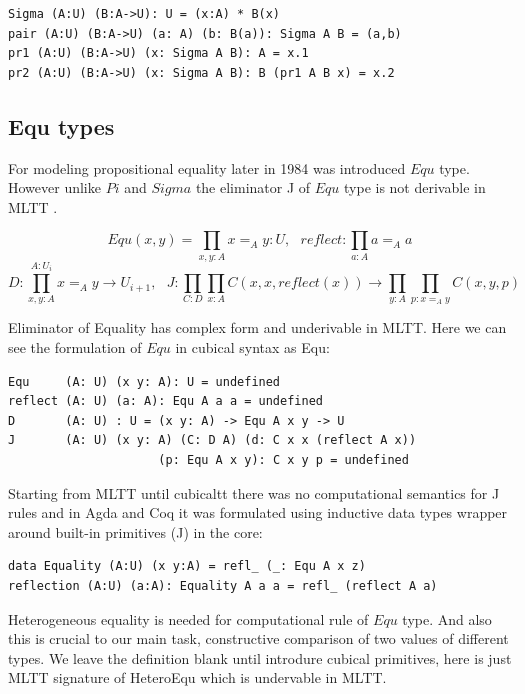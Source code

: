 \documentclass{svproc}
\begin{document}
\begin{lstlisting}[mathescape=true]
Sigma (A:U) (B:A->U): U = (x:A) * B(x)
pair (A:U) (B:A->U) (a: A) (b: B(a)): Sigma A B = (a,b)
pr1 (A:U) (B:A->U) (x: Sigma A B): A = x.1
pr2 (A:U) (B:A->U) (x: Sigma A B): B (pr1 A B x) = x.2
\end{lstlisting}

\subsection{Equ types}

For modeling propositional equality later in 1984 was introduced $Equ$ type. \cite{Lof84}
However unlike $Pi$ and $Sigma$ the eliminator J of $Equ$ type is
not derivable in MLTT \cite{Hofmann96, Mortberg17, HoTT}.

$$Equ(x,y) = \prod_{x,y:A} x =_A y : U,\ \ \ 
  reflect : \prod_{a:A} a =_A a$$
$$D : \prod_{x,y:A}^{A:U_i} x =_A y \rightarrow U_{i+1},\ \ \ 
  J : \prod_{C: D} \prod_{x:A} C(x,x,reflect(x)) \rightarrow \prod_{y:A} \prod_{p:x=_A y} C(x,y,p)$$

Eliminator of Equality has complex form and underivable in MLTT.
Here we can see the formulation of $Equ$ in cubical syntax as Equ:

\begin{lstlisting}[mathescape=true]
Equ     (A: U) (x y: A): U = undefined
reflect (A: U) (a: A): Equ A a a = undefined
D       (A: U) : U = (x y: A) -> Equ A x y -> U
J       (A: U) (x y: A) (C: D A) (d: C x x (reflect A x))
                     (p: Equ A x y): C x y p = undefined
\end{lstlisting}

Starting from MLTT until cubicaltt there was no computational semantics
for J rules and in Agda and Coq it was formulated using inductive data types
wrapper around built-in primitives (J) in the core:

\begin{lstlisting}[mathescape=true]
data Equality (A:U) (x y:A) = refl_ (_: Equ A x z)
reflection (A:U) (a:A): Equality A a a = refl_ (reflect A a)
\end{lstlisting}

Heterogeneous equality is needed for computational rule of $Equ$ type.
And also this is crucial to our main task, constructive
comparison of two values of different types. We leave the definition blank
until introdure cubical primitives, here is just MLTT signature of HeteroEqu
which is undervable in MLTT.
\end{document}
